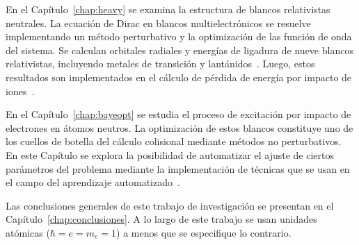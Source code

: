 En el Capítulo~\ref{chap:heavy} se examina la estructura de blancos 
relativistas neutrales. La ecuación de Dirac en blancos 
multielectrónicos se resuelve implementando un método perturbativo y la 
optimización de las función de onda del sistema. Se calculan orbitales 
radiales y energías de ligadura de nueve blancos relativistas, 
incluyendo metales de transición y lantánidos~\cite{Mendez:19relat}. 
Luego, estos resultados son implementados en el cálculo de pérdida de 
energía por impacto de iones~\cite{Montanari:20}.

En el Capítulo~\ref{chap:bayeopt} se estudia el proceso de excitación
por impacto de electrones en átomos neutros. La optimización de estos 
blancos constituye uno de los cuellos de botella del cálculo colisional 
mediante métodos no perturbativos. En este Capítulo se explora la 
posibilidad de automatizar el ajuste de ciertos parámetros del problema 
mediante la implementación de técnicas que se usan en el campo del 
aprendizaje automatizado~\cite{Mendez:20baye,Mendez:prep}.

Las conclusiones generales de este trabajo de investigación se presentan 
en el Capítulo~\ref{chap:conclusiones}.
A lo largo de este trabajo se usan unidades atómicas ($\hbar=e=m_e=1$)
a menos que se especifique lo contrario.


